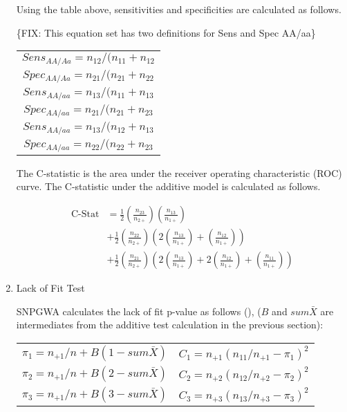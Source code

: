 \begin{enumerate}
Using the table above, sensitivities and specificities are calculated as
follows.

\{FIX: This equation set has two definitions for Sens and Spec AA/aa\}
\begin{center}
  \begin{tabular}{c}
    $Sens_{AA/Aa} = n_{12}/(n_{11} + n_{12}$ \\
    $Spec_{AA/Aa} = n_{21}/(n_{21} + n_{22}$ \\
    $Sens_{AA/aa} = n_{13}/(n_{11} + n_{13}$ \\
    $Spec_{AA/aa} = n_{21}/(n_{21} + n_{23}$ \\
    $Sens_{AA/aa} = n_{13}/(n_{12} + n_{13}$ \\
    $Spec_{AA/aa} = n_{22}/(n_{22} + n_{23}$ \\
  \end{tabular}
\end{center}

The C-statistic is the area under the receiver operating characteristic (ROC)
curve.  The C-statistic under the additive model is calculated as follows.

\begin{align*}
  \text{C-Stat} &= \frac{1}{2}\left(\frac{n_{23}}{n_{2+}}\right)\left(\frac{n_{13}}{n_{1+}}\right) \\
          &+ \frac{1}{2}\left(\frac{n_{22}}{n_{2+}}\right)\left(2\left(\frac{n_{13}}{n_{1+}}\right)+\left(\frac{n_{12}}{n_{1+}}\right)\right) \\
          &+ \frac{1}{2}\left(\frac{n_{21}}{n_{2+}}\right)\left(2\left(\frac{n_{13}}{n_{1+}}\right) + 2\left(\frac{n_{12}}{n_{1+}}\right) + \left(\frac{n_{11}}{n_{1+}}\right)\right)
\end{align*}

\item{Lack of Fit Test} 

  SNPGWA calculates the lack of fit p-value as follows (\cite{Agresti02}), ($B$
  and $sum\bar{X}$ are intermediates from the additive test calculation in the
  previous section):
  \begin{center}
    \begin{tabular}{ll}
      $\pi_1 = n_{+1}/n + B(1-sum\bar{X})$ & $C_1 = n_{+1}(n_{11}/n_{+1} - \pi_1)^2$ \\
      $\pi_2 = n_{+1}/n + B(2-sum\bar{X})$ & $C_2 = n_{+2}(n_{12}/n_{+2} - \pi_2)^2$ \\
      $\pi_3 = n_{+1}/n + B(3-sum\bar{X})$ & $C_3 = n_{+3}(n_{13}/n_{+3} - \pi_3)^2$ \\
    \end{tabular}
  \end{center}


\end{enumerate}
